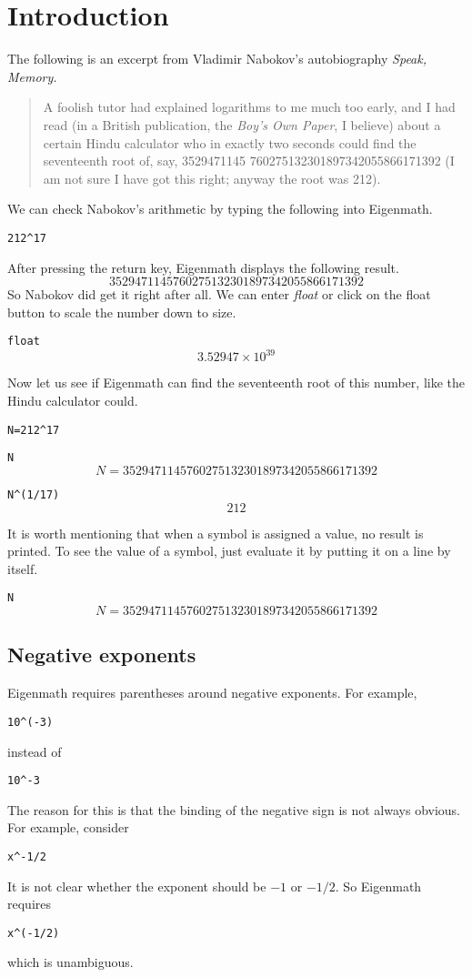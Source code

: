 \section{Introduction}
The following is an excerpt from Vladimir Nabokov's
autobiography {\it Speak, Memory.}
\begin{quote}
A foolish tutor had explained logarithms to me much too early, and I had
read (in a British publication, the {\it Boy's Own Paper}, I believe)
about a certain Hindu calculator who in exactly two seconds could find the
seventeenth root of, say,
3529471145 760275132301897342055866171392
(I am not sure I have got this right; anyway the root was 212).
\end{quote}
We can check Nabokov's arithmetic by typing the following into Eigenmath.

\medskip
\verb$212^17$

\medskip
\noindent
After pressing the return key, Eigenmath displays the following result.
$$3529471145760275132301897342055866171392$$
So Nabokov did get it right after all.
We can enter {\it float} or click on the float button to scale the number
down to size.

\medskip
\verb$float$
$$3.52947\times10^{39}$$

\medskip
\noindent
Now let us see if Eigenmath can find the
seventeenth root of this number, like the Hindu calculator could.

\medskip
\verb$N=212^17$

\verb$N$
$$N=3529471145760275132301897342055866171392$$

\verb$N^(1/17)$
$$212$$

\medskip
\noindent
It is worth mentioning that when a symbol is assigned a value,
no result is printed.
To see the value of a symbol, just evaluate it by putting it on a line by
itself.

\medskip
\verb$N$
$$N=3529471145760275132301897342055866171392$$

\newpage

\subsection{Negative exponents}
Eigenmath requires parentheses around negative exponents.
For example,

\medskip
\verb$10^(-3)$

\medskip
\noindent
instead of

\medskip
\verb$10^-3$

\medskip
\noindent
The reason for this is that the binding of the negative sign is not always
obvious.
For example, consider

\medskip
\verb$x^-1/2$

\medskip
\noindent
It is not clear whether the exponent should be $-1$ or $-1/2$.
So Eigenmath requires

\medskip
\verb$x^(-1/2)$

\medskip
\noindent
which is unambiguous.
